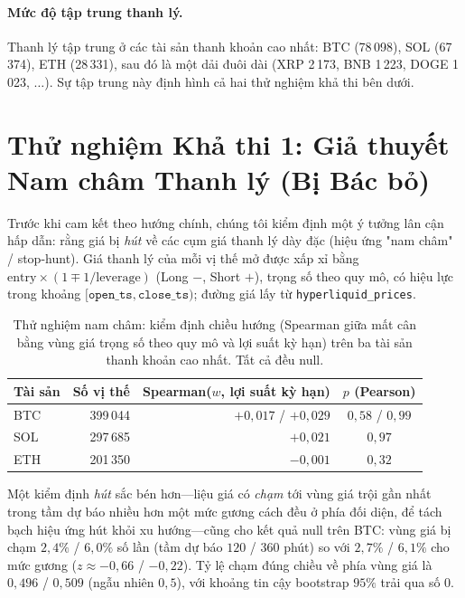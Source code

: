 \documentclass[11pt,a4paper]{article}
\begin{document}
\paragraph{Mức độ tập trung thanh lý.} Thanh lý tập trung ở các tài sản thanh khoản cao nhất: BTC (78\,098), SOL (67\,374), ETH (28\,331), sau đó là một dải đuôi dài (XRP 2\,173, BNB 1\,223, DOGE 1\,023, $\ldots$). Sự tập trung này định hình cả hai thử nghiệm khả thi bên dưới.

\section{Thử nghiệm Khả thi 1: Giả thuyết Nam châm Thanh lý (Bị Bác bỏ)}
\label{sec:m0magnet}

Trước khi cam kết theo hướng chính, chúng tôi kiểm định một ý tưởng lân cận hấp dẫn: rằng giá bị \emph{hút} về các cụm giá thanh lý dày đặc (hiệu ứng "nam châm" / stop-hunt). Giá thanh lý của mỗi vị thế mở được xấp xỉ bằng $\text{entry}\times(1 \mp 1/\text{leverage})$ (Long $-$, Short $+$), trọng số theo quy mô, có hiệu lực trong khoảng $[\texttt{open\_ts}, \texttt{close\_ts})$; đường giá lấy từ \texttt{hyperliquid\_prices}.

\begin{table}[ht]
\centering
\caption{Thử nghiệm nam châm: kiểm định chiều hướng (Spearman giữa mất cân bằng vùng giá trọng số theo quy mô và lợi suất kỳ hạn) trên ba tài sản thanh khoản cao nhất. Tất cả đều null.}
\label{tab:magnet}
\begin{tabular}{lrrc}
\toprule
Tài sản & Số vị thế & Spearman($w$, lợi suất kỳ hạn) & $p$ (Pearson) \\
\midrule
BTC & 399\,044 & $+0{,}017$ / $+0{,}029$ & $0{,}58$ / $0{,}99$ \\
SOL & 297\,685 & $+0{,}021$ & $0{,}97$ \\
ETH & 201\,350 & $-0{,}001$ & $0{,}32$ \\
\bottomrule
\end{tabular}
\end{table}

Một kiểm định \emph{hút} sắc bén hơn---liệu giá có \emph{chạm} tới vùng giá trội gần nhất trong tầm dự báo nhiều hơn một mức gương cách đều ở phía đối diện, để tách bạch hiệu ứng hút khỏi xu hướng---cũng cho kết quả null trên BTC: vùng giá bị chạm $2{,}4\%$ / $6{,}0\%$ số lần (tầm dự báo $120$ / $360$ phút) so với $2{,}7\%$ / $6{,}1\%$ cho mức gương ($z\approx-0{,}66$ / $-0{,}22$). Tỷ lệ chạm đúng chiều về phía vùng giá là $0{,}496$ / $0{,}509$ (ngẫu nhiên $0{,}5$), với khoảng tin cậy bootstrap $95\%$ trải qua số 0.
\end{document}
